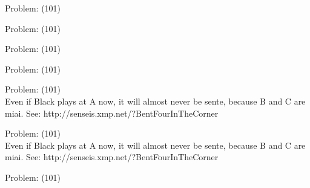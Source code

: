 \documentclass[11pt]{article}
\begin{document}
\begin{minipage}[t]{0.5\textwidth}
  {\centering
  
  Problem: (101)\\
  
  }
\end{minipage}
\begin{minipage}[t]{0.5\textwidth}
  {\centering
  
  Problem: (101)\\
  
  }
\end{minipage}
\begin{minipage}[t]{0.5\textwidth}
  {\centering
  
  Problem: (101)\\
  
  }
\end{minipage}
\begin{minipage}[t]{0.5\textwidth}
  {\centering
  
  Problem: (101)\\
  
  }
\end{minipage}
\begin{minipage}[t]{0.5\textwidth}
  {\centering
  
  Problem: (101)\\
  Even if Black plays at A now, it will almost never be sente, because B and C are miai. See: http://senseis.xmp.net/?BentFourInTheCorner\\
  }
\end{minipage}
\begin{minipage}[t]{0.5\textwidth}
  {\centering
  
  Problem: (101)\\
  Even if Black plays at A now, it will almost never be sente, because B and C are miai. See: http://senseis.xmp.net/?BentFourInTheCorner\\
  }
\end{minipage}
\begin{minipage}[t]{0.5\textwidth}
  {\centering
  
  Problem: (101)\\
  
  }
\end{minipage}
\end{document}
